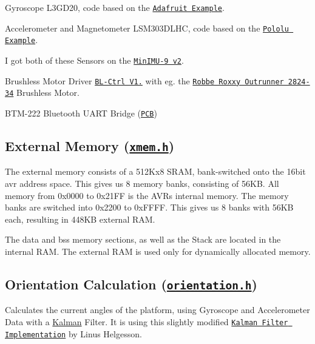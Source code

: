 \begin{DoxyItemize}
\item Gyroscope L3\-G\-D20, code based on the \href{https://github.com/adafruit/Adafruit_L3GD20}{\tt Adafruit Example}.
\item Accelerometer and Magnetometer L\-S\-M303\-D\-L\-H\-C, code based on the \href{https://github.com/pololu/LSM303}{\tt Pololu Example}.
\item I got both of these Sensors on the \href{http://www.pololu.com/catalog/product/1268}{\tt Min\-I\-M\-U-\/9 v2}.
\item Brushless Motor Driver \href{http://www.mikrokopter.de/ucwiki/en/BL-Ctrl_V1.2}{\tt B\-L-\/\-Ctrl V1.} with eg. the \href{http://www.conrad.de/ce/de/product/231867}{\tt Robbe Roxxy Outrunner 2824-\/34} Brushless Motor.
\item B\-T\-M-\/222 Bluetooth U\-A\-R\-T Bridge (\href{http://xythobuz.de/bluetooth.html}{\tt P\-C\-B})
\end{DoxyItemize}

\subsection*{External Memory (\href{https://github.com/xythobuz/xyControl/blob/master/include/xmem.h}{\tt xmem.\-h})}

The external memory consists of a 512\-Kx8 S\-R\-A\-M, bank-\/switched onto the 16bit avr address space. This gives us 8 memory banks, consisting of 56\-K\-B. All memory from 0x0000 to 0x21\-F\-F is the A\-V\-Rs internal memory. The memory banks are switched into 0x2200 to 0x\-F\-F\-F\-F. This gives us 8 banks with 56\-K\-B each, resulting in 448\-K\-B external R\-A\-M.

The data and bss memory sections, as well as the Stack are located in the internal R\-A\-M. The external R\-A\-M is used only for dynamically allocated memory.

\subsection*{Orientation Calculation (\href{https://github.com/xythobuz/xyControl/blob/master/include/orientation.h}{\tt orientation.\-h})}

Calculates the current angles of the platform, using Gyroscope and Accelerometer Data with a \hyperlink{struct_kalman}{Kalman} Filter. It is using this slightly modified \href{http://www.linushelgesson.se/2012/04/pitch-and-roll-estimating-kalman-filter-for-stabilizing-quadrocopters/}{\tt Kalman Filter Implementation} by Linus Helgesson.

